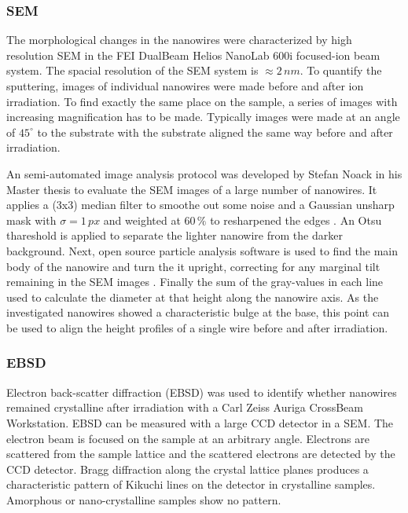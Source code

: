 \subsubsection{SEM}

The morphological changes in the nanowires were characterized by high resolution SEM in the FEI DualBeam Helios NanoLab 600i focused-ion beam system. The spacial resolution of the SEM system is $\approx 2\,nm$. To quantify the sputtering, images of individual nanowires were made before and after ion irradiation. To find exactly the same place on the sample, a series of images with increasing magnification has to be made. Typically images were made at an angle of $45^\circ$ to the substrate with the substrate aligned the same way before and after irradiation.

An semi-automated image analysis protocol was developed by Stefan Noack in his Master thesis \cite{noack_sputter_2014, NL} to evaluate the SEM images of a large number of nanowires. It applies a (3x3) median filter to smoothe out some noise and a Gaussian unsharp mask with $\sigma = 1\,px$ and weighted at $60\,\%$ to resharpened the edges \cite{sankur_survey_2004}. An Otsu thareshold \cite{otsu_threshold_1979} is applied to separate the lighter nanowire from the darker background. Next, open source particle analysis software is used to find the main body of the nanowire and turn the it upright, correcting for any marginal tilt remaining in the SEM images \cite{schindelin_fiji:_2012,sage_imagej_2012}. Finally the sum of the gray-values in each line used to calculate the diameter at that height along the nanowire axis. As the investigated nanowires showed a characteristic bulge at the base, this point can be used to align the height profiles of a single wire before and after irradiation.

\subsubsection{EBSD}

Electron back-scatter diffraction (EBSD) was used to identify whether nanowires remained crystalline after irradiation with a Carl Zeiss Auriga CrossBeam Workstation. EBSD can be measured with a large CCD detector in a SEM. The electron beam is focused on the sample at an arbitrary angle. Electrons are scattered from the sample lattice and the scattered electrons are detected by the CCD detector. Bragg diffraction along the crystal lattice planes produces a characteristic pattern of Kikuchi lines on the detector \cite{kikuchi_diffraction_1928,fultz_transmission_2013} in crystalline samples. Amorphous or nano-crystalline samples show no pattern.

